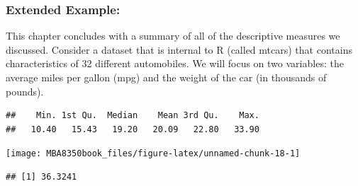 \documentclass[
]{book}
\newenvironment{Shaded}{\begin{snugshade}}{\end{snugshade}}
\newcommand{\AttributeTok}[1]{\textcolor[rgb]{0.77,0.63,0.00}{#1}}
\newcommand{\CommentTok}[1]{\textcolor[rgb]{0.56,0.35,0.01}{\textit{#1}}}
\newcommand{\DecValTok}[1]{\textcolor[rgb]{0.00,0.00,0.81}{#1}}
\newcommand{\FunctionTok}[1]{\textcolor[rgb]{0.00,0.00,0.00}{#1}}
\newcommand{\NormalTok}[1]{#1}
\newcommand{\OtherTok}[1]{\textcolor[rgb]{0.56,0.35,0.01}{#1}}
\newcommand{\SpecialCharTok}[1]{\textcolor[rgb]{0.00,0.00,0.00}{#1}}
\newcommand{\StringTok}[1]{\textcolor[rgb]{0.31,0.60,0.02}{#1}}
\begin{document}
\hypertarget{extended-example}{%
\subsubsection*{Extended Example:}\label{extended-example}}

This chapter concludes with a summary of all of the descriptive measures we discussed. Consider a dataset that is internal to R (called mtcars) that contains characteristics of 32 different automobiles. We will focus on two variables: the average miles per gallon (mpg) and the weight of the car (in thousands of pounds).

\begin{Shaded}
\end{Shaded}

\begin{verbatim}
##    Min. 1st Qu.  Median    Mean 3rd Qu.    Max. 
##   10.40   15.43   19.20   20.09   22.80   33.90
\end{verbatim}

\begin{Shaded}
\end{Shaded}

\begin{center}\texttt{[image: MBA8350book\_files/figure-latex/unnamed-chunk-18-1]} \end{center}

\begin{Shaded}
\end{Shaded}

\begin{verbatim}
## [1] 36.3241
\end{verbatim}
\end{document}
